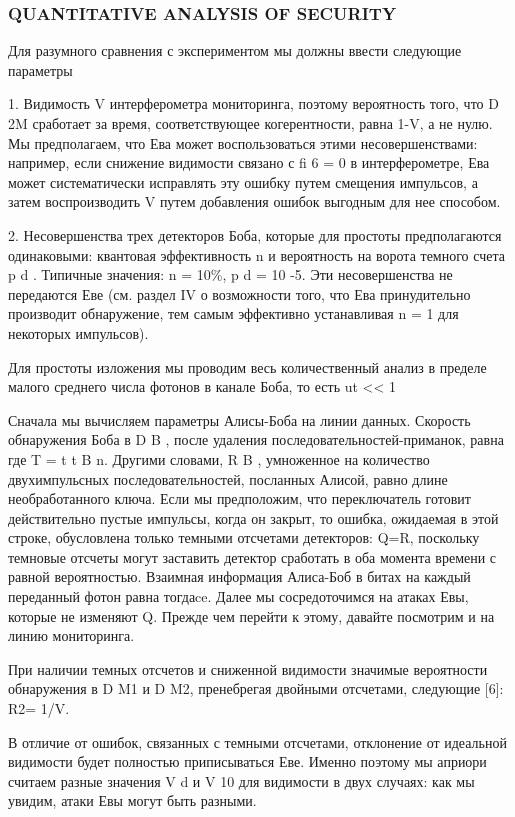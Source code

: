 \subsubsection{QUANTITATIVE ANALYSIS OF SECURITY}

Для разумного сравнения с экспериментом мы должны ввести следующие параметры

1. Видимость V интерферометра мониторинга, поэтому вероятность того, что D 2M сработает за время, соответствующее когерентности, равна 1-V, а не нулю. Мы предполагаем, что Ева может воспользоваться этими несовершенствами: например, если снижение видимости связано с fi 6 = 0 в интерферометре, Ева может систематически исправлять эту ошибку путем смещения импульсов, а затем воспроизводить V путем добавления ошибок выгодным для нее способом.

2. Несовершенства трех детекторов Боба, которые для простоты предполагаются одинаковыми: квантовая эффективность n и вероятность на ворота темного счета p d . Типичные значения: n = 10\%, p d = 10 -5. Эти несовершенства не передаются Еве (см. раздел IV о возможности того, что Ева принудительно производит обнаружение, тем самым эффективно устанавливая n = 1 для некоторых импульсов).

Для простоты изложения мы проводим весь количественный анализ в пределе малого среднего числа фотонов в канале Боба, то есть ut << 1

Сначала мы вычисляем параметры Алисы-Боба на линии данных. Скорость обнаружения Боба в D B , после удаления последовательностей-приманок, равна где T = t t B n. Другими словами, R B , умноженное на количество двухимпульсных последовательностей, посланных Алисой, равно длине необработанного ключа.
Если мы предположим, что переключатель готовит действительно пустые импульсы, когда он закрыт, то ошибка, ожидаемая в этой строке, обусловлена только темными отсчетами детекторов: Q=R, поскольку темновые отсчеты могут заставить детектор сработать в оба момента времени с равной вероятностью. Взаимная информация Алиса-Боб в битах на каждый переданный фотон равна тогдаce. Далее мы сосредоточимся на атаках Евы, которые не изменяют Q. Прежде чем перейти к этому, давайте посмотрим и на линию мониторинга.

При наличии темных отсчетов и сниженной видимости значимые вероятности обнаружения в D M1 и D M2, пренебрегая двойными отсчетами, следующие [6]: R2= 1/V.

В отличие от ошибок, связанных с темными отсчетами, отклонение от идеальной видимости будет полностью приписываться Еве. Именно поэтому мы априори считаем разные значения V d и V 10 для видимости в двух случаях: как мы увидим, атаки Евы могут быть разными.

